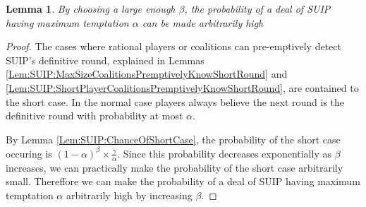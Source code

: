 \documentclass{dalcsthesis}
\newtheorem{lemma}{Lemma}
\begin{document}
\begin{lemma} By choosing a large enough $\beta$, the probability of a deal of SUIP having maximum temptation $\alpha$ can be made arbitrarily high \label{Lem:SUIP:HighTemptationAvoidable} \end{lemma}
\begin{proof}
The cases where rational players or coalitions can pre-emptively detect SUIP's definitive round, explained in Lemmas \ref{Lem:SUIP:MaxSizeCoalitionsPremptivelyKnowShortRound} and \ref{Lem:SUIP:ShortPlayerCoalitionsPremptivelyKnowShortRound}, are contained to the short case. In the normal case players always believe the next round is the definitive round with probability at most $\alpha$.

By Lemma \ref{Lem:SUIP:ChanceOfShortCase}, the probability of the short case occuring is $(1-\alpha)^\beta \times \frac{\gamma}{\alpha}$. Since this probability decreases exponentially as $\beta$ increases, we can practically make the probability of the short case arbitrarily small. Thereffore we can make the probability of a deal of SUIP having maximum temptation $\alpha$ arbitrarily high by increasing $\beta$.
\end{proof}
\end{document}
